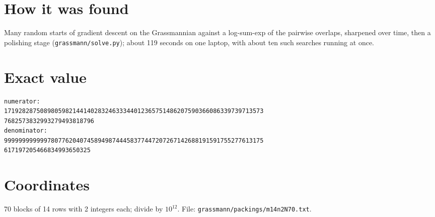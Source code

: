 \documentclass[11pt,a4paper]{article}
\begin{document}
\section{How it was found}
Many random starts of gradient descent on the Grassmannian against a log-sum-exp of the pairwise overlaps, sharpened over time, then a polishing stage (\texttt{grassmann/solve.py}); about 119 seconds on one laptop, with about ten such searches running at once.


\appendix
\section{Exact value}
{\small
\begin{verbatim}
numerator:
171928287508980598214414028324633344012365751486207590366086339739713573
7682573832993279493818796
denominator:
999999999999780776204074589498744458377447207267142688191591755277613175
617197205466834993650325
\end{verbatim}}

\section{Coordinates}
70 blocks of 14 rows with 2 integers each; divide by $10^{12}$. File: \texttt{grassmann/packings/m14n2N70.txt}.
{\tiny
\begin{multicols}{4}
\end{multicols}}
\end{document}

